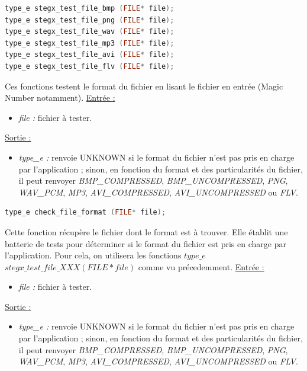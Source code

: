 \documentclass[11pt]{article}
\begin{document}
\begin{lstlisting}[language=c]
type_e stegx_test_file_bmp (FILE* file);
type_e stegx_test_file_png (FILE* file);
type_e stegx_test_file_wav (FILE* file);
type_e stegx_test_file_mp3 (FILE* file);
type_e stegx_test_file_avi (FILE* file);
type_e stegx_test_file_flv (FILE* file);
\end{lstlisting}

Ces fonctions testent le format du fichier en lisant le fichier en entrée 
(Magic Number notamment). 
\newline
\underline{Entrée :} 
\begin{itemize}
\item \textit{file :} fichier à tester. 
\end{itemize}
\underline{Sortie :} 
\begin{itemize}
\item \textit{type\_e :} renvoie UNKNOWN si le format du fichier n'est pas pris en 
charge par l'application ; sinon, en fonction du format et des particularités 
du fichier, il peut renvoyer \textit{BMP\_COMPRESSED}, \textit{BMP\_UNCOMPRESSED}, 
\textit{PNG}, \textit{WAV\_PCM}, \textit{MP3}, \textit{AVI\_COMPRESSED}, 
\textit{AVI\_UNCOMPRESSED} ou \textit{FLV}. 
\newline 
\end{itemize}

\begin{lstlisting}[language=c]
type_e check_file_format (FILE* file);
\end{lstlisting}

Cette fonction récupère le fichier dont le format est à trouver. Elle établit une 
batterie de tests pour déterminer si le format du fichier est pris en charge 
par l'application. 
Pour cela, on utilisera les fonctions 
$type\_e$ $stegx\_test\_file\_XXX (FILE* file)$ comme vu précedemment. 
\newline
\underline{Entrée :} 
\begin{itemize}
\item \textit{file :} fichier à tester. 
\end{itemize}
\underline{Sortie :} 
\begin{itemize}
\item \textit{type\_e :} renvoie UNKNOWN si le format du fichier n'est pas pris en 
charge par l'application ; sinon, en fonction du format et des particularités 
du fichier, il peut renvoyer \textit{BMP\_COMPRESSED}, \textit{BMP\_UNCOMPRESSED}, 
\textit{PNG}, \textit{WAV\_PCM}, \textit{MP3}, \textit{AVI\_COMPRESSED}, 
\textit{AVI\_UNCOMPRESSED} ou \textit{FLV}. 
\newline 
\end{itemize}
\end{document}
